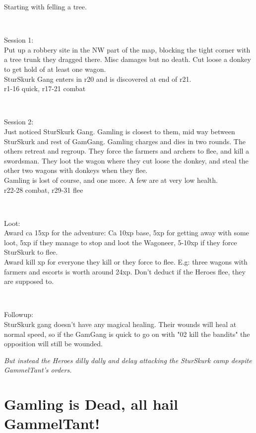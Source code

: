 Starting with felling a tree.

\

Session 1: \\
Put up a robbery site in the NW part of the map, blocking the tight corner with a tree trunk they dragged there. Misc damages but no death. Cut loose a donkey to get hold of at least one wagon.\\
SturSkurk Gang enters in r20 and is discovered at end of r21.\\
r1-16 quick, r17-21 combat

\

Session 2:\\
Just noticed SturSkurk Gang. Gamling is closest to them, mid way between SturSkurk and rest of GamGang. Gamling charges and dies in two rounds. The others retreat and regroup. They force the farmers and archers to flee, and kill a swordsman. They loot the wagon where they cut loose the donkey, and steal the other two wagons with donkeys when they flee.\\
Gamling is lost of course, and one more. A few are at very low health.\\
r22-28 combat, r29-31 flee

\

Loot:\\
Award ca 15xp for the adventure: Ca 10xp base, 5xp for getting away with some loot, 5xp if they manage to stop and loot the Wagoneer, 5-10xp if they force SturSkurk to flee.\\
Award kill xp for everyone they kill or they force to flee. E.g: three wagons with farmers and escorts is worth around 24xp. Don't deduct if the Heroes flee, they are supposed to.

\

Followup:\\
SturSkurk gang doesn't have any magical healing. Their wounds will heal at normal speed, so if the GamGang is quick to go on with "02 kill the bandits" the opposition will still be wounded.

\textit{But instead the Heroes dilly dally and delay attacking the SturSkurk camp despite GammelTant's orders.}




\vfill
\section*{Gamling is Dead, all hail GammelTant!}

